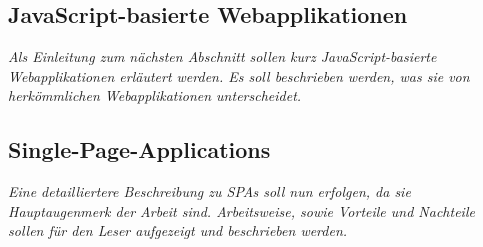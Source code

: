 \subsection{JavaScript-basierte Webapplikationen}

\textit{Als Einleitung zum nächsten Abschnitt sollen kurz JavaScript-basierte Webapplikationen erläutert werden. Es soll beschrieben werden, was sie von herkömmlichen Webapplikationen unterscheidet.}

\subsection{Single-Page-Applications}
\label{subsec:singe-page-applications}

\textit{Eine detailliertere Beschreibung zu SPAs soll nun erfolgen, da sie Hauptaugenmerk der Arbeit sind. Arbeitsweise, sowie Vorteile und Nachteile sollen für den Leser aufgezeigt und beschrieben werden.}